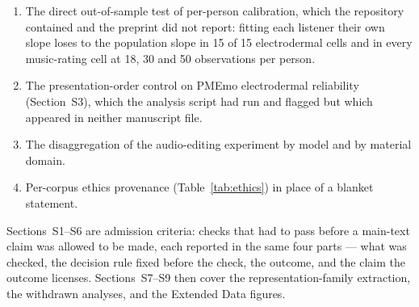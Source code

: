 \begin{enumerate}
\item The direct out-of-sample test of per-person calibration, which the
repository contained and the preprint did not report: fitting each listener
their own slope loses to the population slope in 15 of 15 electrodermal cells
and in every music-rating cell at 18, 30 and 50 observations per person.

\item The presentation-order control on PMEmo electrodermal reliability
(Section~S3), which the analysis script had run and flagged but
which appeared in neither manuscript file.

\item The disaggregation of the audio-editing experiment by model and by
material domain.

\item Per-corpus ethics provenance (Table~\ref{tab:ethics}) in place of a
blanket statement.
\end{enumerate}


Sections~S1--S6 are admission criteria: checks that had to pass before a main-text
claim was allowed to be made, each reported in the same four parts --- what was
checked, the decision rule fixed before the check, the outcome, and the claim the
outcome licenses. Sections~S7--S9 then cover the representation-family extraction,
the withdrawn analyses, and the Extended Data figures.

